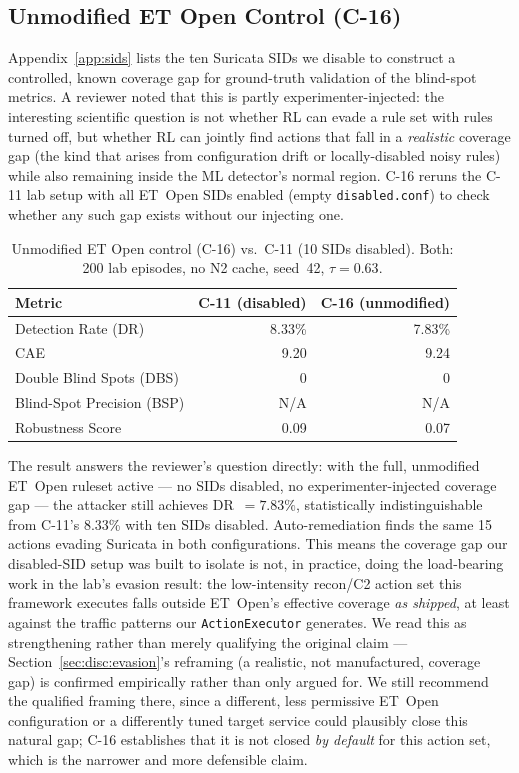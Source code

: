 \documentclass[sigconf]{acmart}
\begin{document}
\subsection{Unmodified ET Open Control (C-16)}
\label{app:unmodified}

Appendix~\ref{app:sids} lists the ten Suricata SIDs we disable to
construct a controlled, known coverage gap for ground-truth validation
of the blind-spot metrics. A reviewer noted that this is partly
experimenter-injected: the interesting scientific question is not
whether RL can evade a rule set with rules turned off, but whether RL
can jointly find actions that fall in a \emph{realistic} coverage gap
(the kind that arises from configuration drift or locally-disabled
noisy rules) while also remaining inside the ML detector's normal
region. C-16 reruns the C-11 lab setup with all ET~Open SIDs enabled
(empty \texttt{disabled.conf}) to check whether any such gap exists
without our injecting one.

\begin{table}[t]
\caption{Unmodified ET Open control (C-16) vs.\ C-11 (10 SIDs disabled).
Both: 200 lab episodes, no N2 cache, seed~42, $\tau=0.63$.}
\label{tab:unmodified}
\centering
\small
\begin{tabular}{l r r}
\toprule
Metric & C-11 (disabled) & C-16 (unmodified) \\
\midrule
Detection Rate (DR)        & 8.33\%  & 7.83\%  \\
CAE                        & 9.20    & 9.24    \\
Double Blind Spots (DBS)   & 0       & 0       \\
Blind-Spot Precision (BSP) & N/A     & N/A     \\
Robustness Score           & 0.09    & 0.07    \\
\bottomrule
\end{tabular}
\end{table}

The result answers the reviewer's question directly: with the full,
unmodified ET~Open ruleset active --- no SIDs disabled, no
experimenter-injected coverage gap --- the attacker still achieves
DR~$= 7.83\%$, statistically indistinguishable from C-11's 8.33\% with
ten SIDs disabled. Auto-remediation finds the same 15 actions evading
Suricata in both configurations. This means the coverage gap our
disabled-SID setup was built to isolate is not, in practice, doing the
load-bearing work in the lab's evasion result: the low-intensity
recon/C2 action set this framework executes falls outside ET~Open's
effective coverage \emph{as shipped}, at least against the traffic
patterns our \texttt{ActionExecutor} generates. We read this as
strengthening rather than merely qualifying the original claim ---
Section~\ref{sec:disc:evasion}'s reframing (a realistic, not
manufactured, coverage gap) is confirmed empirically rather than only
argued for. We still recommend the qualified framing there, since a
different, less permissive ET~Open configuration or a differently
tuned target service could plausibly close this natural gap; C-16
establishes that it is not closed \emph{by default} for this action
set, which is the narrower and more defensible claim.
\end{document}
